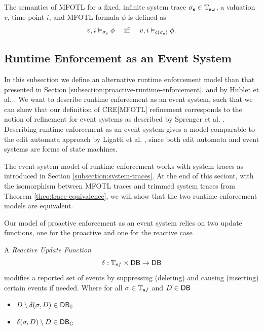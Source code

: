 \begin{definition}
    \label{def:mfotl-semantics-for-system-traces}
    The semantics of MFOTL for a fixed, infinite system trace
    $\sigma_{\mathbf{s}} \in \mathbb{T}_{\mathbf{s} \omega}$, a valuation $v$,
    time-point $i$, and MFOTL formula $\phi$ is defined as
    \begin{equation*}
        v, i \vDash_{\sigma_{\mathbf{s}}} \phi \quad \text{ iff } \quad
        v, i \vDash_{\mathsf{c}(\sigma_{\mathbf{s}})} \phi.
    \end{equation*}
\end{definition}

\subsection{Runtime Enforcement as an Event System}
\label{subsection:runtime-enforcement-event-system}


In this subsection we define an alternative runtime
enforcement model than that presented in Section
\ref{subsection:proactive-runtime-enforcement}.
and by Hublet et al. \cite{whyenf}.
We want to describe runtime enforcement as an
event system, such that we can show that our
definition of CRE[MFOTL] refinement corresponds to
the notion of refinement for event systems as described
by Sprenger et al. \cite{igloo}.
Describing runtime enforcement as an event system gives
a model comparable to the edit automata approach by
Ligatti et al. \cite{edit-automata}, since both
edit automata and event systems are forms of state machines.

The event system model of runtime enforcement
works with system traces as introduced in Section
\ref{subsection:system-traces}.
At the end of this seciont, 
with the isomorphism between MFOTL traces and
trimmed system traces from Theorem
\ref{theo:trace-equivalence}, we will show that
the two runtime enforcement models are equivalent.

Our model of proactive enforcement as an event system relies on two 
update functions, one for the proactive and one for the reactive case

\begin{definition}
    \label{def:reactive-update-function}
    A \emph{Reactive Update Function}
    \begin{equation*}
       \delta : \mathbb{T}_{\mathbf{s} f} \times \mathsf{DB} \to \mathsf{DB}
    \end{equation*}
    modifies a reported  set of events by suppressing
    (deleting) and causing (inserting) certain events
    if needed.
    Where for all $\sigma \in \mathbb{T}_{\mathbf{s} f}$
    and $D \in \mathsf{DB}$
    \begin{itemize}
        \item $D \setminus \delta(\sigma, D) \in \mathsf{DB}_{\mathbb{S}}$
        \item $\delta(\sigma, D) \setminus D \in \mathsf{DB}_{\mathbb{C}}$
    \end{itemize}
\end{definition}

